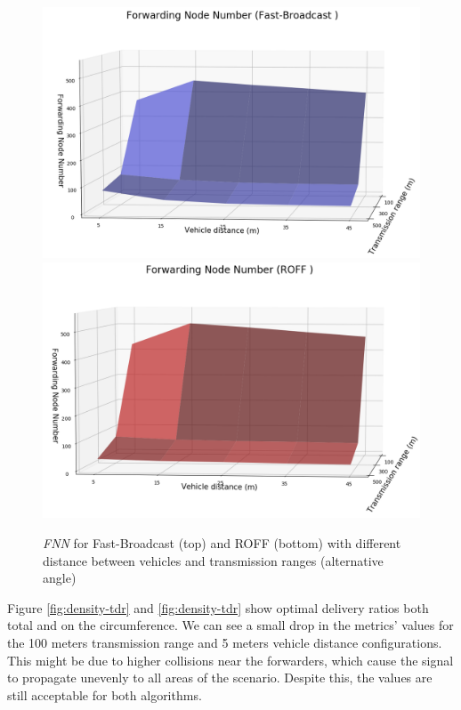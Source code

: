 		\begin{figure}[H]
			\centering
			\includegraphics[width=1.0\textwidth]{immagini/density/fb/fnn-2}
			\includegraphics[width=1.0\textwidth]{immagini/density/roff/fnn-2}
			\caption{\textit{FNN} for Fast-Broadcast (top) and ROFF (bottom) with different distance between vehicles and transmission ranges (alternative angle)}
			\label{fig:density-fnn-2}
		\end{figure}
	
		Figure \ref{fig:density-tdr} and \ref{fig:density-tdr} show optimal delivery ratios both total and on the circumference. We can see a small drop in the metrics' values for the 100 meters transmission range and 5 meters vehicle distance configurations. This might be due to higher collisions near the forwarders, which cause the signal to propagate unevenly to all areas of the scenario. Despite this, the values are still acceptable for both algorithms.
		

